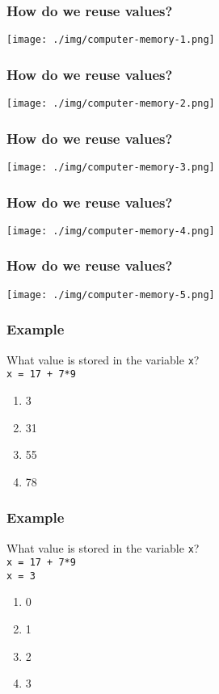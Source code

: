 \documentclass[11pt]{beamer}
\begin{document}
\begin{frame}
  \frametitle{How do we reuse values?}
  \texttt{[image: ./img/computer-memory-1.png]}
\end{frame}

\begin{frame}
  \frametitle{How do we reuse values?}
  \texttt{[image: ./img/computer-memory-2.png]}
\end{frame}

\begin{frame}
  \frametitle{How do we reuse values?}
  \texttt{[image: ./img/computer-memory-3.png]}
\end{frame}

\begin{frame}
  \frametitle{How do we reuse values?}
  \texttt{[image: ./img/computer-memory-4.png]}
\end{frame}

\begin{frame}
  \frametitle{How do we reuse values?}
  \texttt{[image: ./img/computer-memory-5.png]}
\end{frame}

\begin{frame}
  \frametitle{Example}
  \Enlarge

  What value is stored in the variable \texttt{x}? \\
  \texttt{x = 17 + 7*9}
  \begin{enumerate}[label=\Alph*]
  \item  3
  \item  31
  \item  55
  \item  78
  \end{enumerate}
\end{frame}

\begin{frame}
  \frametitle{Example}
  \Enlarge

  What value is stored in the variable \texttt{x}? \\
  \texttt{x = 17 + 7*9} \\
  \texttt{x = 3}
  \begin{enumerate}[label=\Alph*]
  \item  0
  \item  1
  \item  2
  \item  3
  \end{enumerate}
\end{frame}
\end{document}
